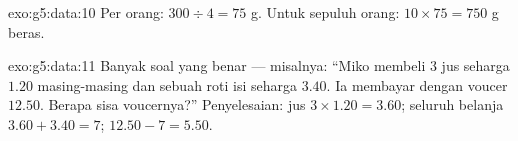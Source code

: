 \begin{solution}{exo:g5:data:10}
Per orang: $300 \div 4 = 75$ g. Untuk sepuluh orang:
$10 \times 75 = 750$ g beras.
\end{solution}

\begin{solution}{exo:g5:data:11}
Banyak soal yang benar --- misalnya: ``Miko membeli $3$ jus seharga
$1.20$ masing-masing dan sebuah roti isi seharga $3.40$. Ia membayar
dengan voucer $12.50$. Berapa sisa voucernya?'' Penyelesaian: jus
$3 \times 1.20 = 3.60$; seluruh belanja $3.60 + 3.40 = 7$; 
$12.50 - 7 = 5.50$.

\end{solution}
